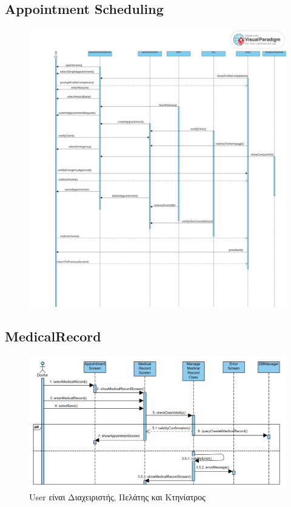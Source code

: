 \documentclass[12pt,a4paper,twoside]{book}
\begin{document}
\subsection{Appointment Scheduling}
\begin{figure}[H]
    \centering
    \includegraphics[width=\textwidth]{Resources/Sequence Diagram/appointmentscheduling_sequence.jpg}\label{fig:sequence-appointment-scheduling}
\end{figure}

\subsection{MedicalRecord}
\begin{figure}[H]
    \centering
    \includegraphics[width=\textwidth]{Resources/Sequence Diagram/MedicalRecord_Sequence.png}
    \caption{User είναι Διαχειριστής, Πελάτης και Κτηνίατρος}\label{fig:sequence-medical-record}
\end{figure}
\end{document}
